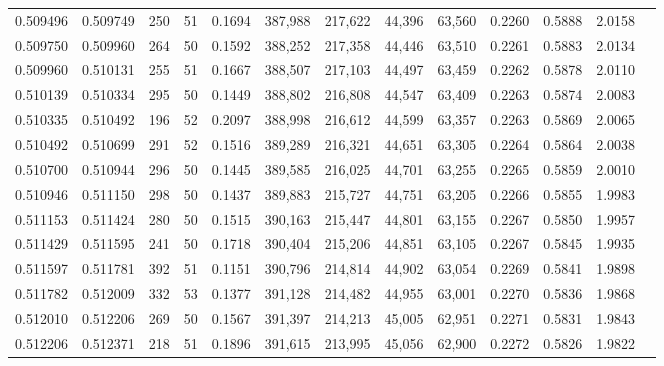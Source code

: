 \begin{tabular}{rrrrrrrrrrrrr}
0.509496 & 0.509749 &   250 &  51 &                                     0.1694 & 387,988 & 217,622 &  44,396 &  63,560 & 0.2260 & 0.5888 & 2.0158 \\
0.509750 & 0.509960 &   264 &  50 &                                     0.1592 & 388,252 & 217,358 &  44,446 &  63,510 & 0.2261 & 0.5883 & 2.0134 \\
0.509960 & 0.510131 &   255 &  51 &                                     0.1667 & 388,507 & 217,103 &  44,497 &  63,459 & 0.2262 & 0.5878 & 2.0110 \\
0.510139 & 0.510334 &   295 &  50 &                                     0.1449 & 388,802 & 216,808 &  44,547 &  63,409 & 0.2263 & 0.5874 & 2.0083 \\
0.510335 & 0.510492 &   196 &  52 &                                     0.2097 & 388,998 & 216,612 &  44,599 &  63,357 & 0.2263 & 0.5869 & 2.0065 \\
0.510492 & 0.510699 &   291 &  52 &                                     0.1516 & 389,289 & 216,321 &  44,651 &  63,305 & 0.2264 & 0.5864 & 2.0038 \\
0.510700 & 0.510944 &   296 &  50 &                                     0.1445 & 389,585 & 216,025 &  44,701 &  63,255 & 0.2265 & 0.5859 & 2.0010 \\
0.510946 & 0.511150 &   298 &  50 &                                     0.1437 & 389,883 & 215,727 &  44,751 &  63,205 & 0.2266 & 0.5855 & 1.9983 \\
0.511153 & 0.511424 &   280 &  50 &                                     0.1515 & 390,163 & 215,447 &  44,801 &  63,155 & 0.2267 & 0.5850 & 1.9957 \\
0.511429 & 0.511595 &   241 &  50 &                                     0.1718 & 390,404 & 215,206 &  44,851 &  63,105 & 0.2267 & 0.5845 & 1.9935 \\
0.511597 & 0.511781 &   392 &  51 &                                     0.1151 & 390,796 & 214,814 &  44,902 &  63,054 & 0.2269 & 0.5841 & 1.9898 \\
0.511782 & 0.512009 &   332 &  53 &                                     0.1377 & 391,128 & 214,482 &  44,955 &  63,001 & 0.2270 & 0.5836 & 1.9868 \\
0.512010 & 0.512206 &   269 &  50 &                                     0.1567 & 391,397 & 214,213 &  45,005 &  62,951 & 0.2271 & 0.5831 & 1.9843 \\
0.512206 & 0.512371 &   218 &  51 &                                     0.1896 & 391,615 & 213,995 &  45,056 &  62,900 & 0.2272 & 0.5826 & 1.9822 \\

\end{tabular}
